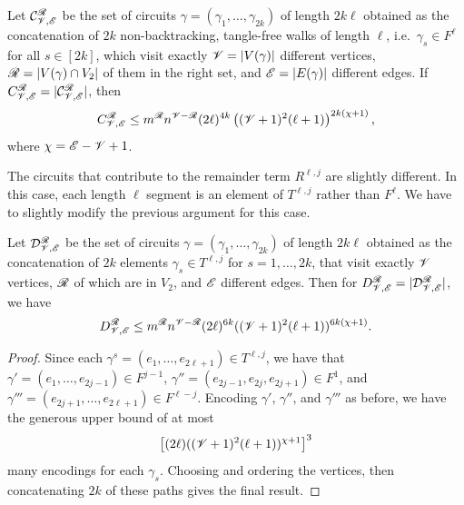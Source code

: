 \begin{lemma}
\label{lem:circuit_count}
Let $\mathcal{C}_{\mathscr{V}, \mathscr{E}}^{\mathscr{R}}$ 
be the set of circuits
$\gamma = (\gamma_1, \ldots, \gamma_{2k})$
of length $2 k \ell$ obtained as the
concatenation of $2k$ non-backtracking,
tangle-free walks of length
$\ell$,
i.e.\ $\gamma_s \in F^\ell$ for all $s \in [2k]$,
which visit exactly 
$\mathscr{V} = |V(\gamma)|$ different vertices, 
$\mathscr{R} = |V(\gamma) \cap V_2|$ of them in the right set, and
$\mathscr{E} = |E(\gamma)|$ different edges.
If $C_{\mathscr{V}, \mathscr{E}}^{\mathscr{R}} = |\mathcal{C}_{\mathscr{V}, \mathscr{E}}^{\mathscr{R}}|$, then
\begin{equation}
C_{\mathscr{V}, \mathscr{E}}^{\mathscr{R}}
\leq
m^{\mathscr{R}} n^{\mathscr{V} - \mathscr{R}} (2 \ell)^{4k} 
\left( (\mathscr{V}+1)^2 (\ell+1) \right)^{2k (\chi + 1)},
\end{equation}
where $\chi = \mathscr{E} - \mathscr{V} + 1$.
\end{lemma}

The circuits that contribute to the remainder term
$R^{\ell, j}$ 
are slightly different.
In this case, each length $\ell$ segment
is an element of $T^{\ell, j}$ rather than $F^{\ell}$.
We have to slightly modify the previous argument for this case.

\begin{lemma}\label{lem:combinatorial_of_reminder}
Let $\mathcal{D}_{\mathscr{V},\mathscr{E}}^{\mathscr{R}}$ 
be the set of circuits
$\gamma = (\gamma_1, \ldots, \gamma_{2k})$
of length $2k\ell$
obtained as the concatenation
of $2k$ elements 
$\gamma_s \in T^{\ell, j}$
for $s = 1, \ldots, 2k$,
that visit exactly $\mathscr{V}$ vertices, 
$\mathscr{R}$ of which are in $V_2$, and $\mathscr{E}$ different edges. 
Then for $D_{\mathscr{V},\mathscr{E}}^{\mathscr{R}} = | \mathcal{D}_{\mathscr{V},\mathscr{E}}^{\mathscr{R}} |$,
we have
\begin{align}
\label{bound:D}
D_{\mathscr{V},\mathscr{E}}^{\mathscr{R}}
\leq
m^{\mathscr{R}} n^{\mathscr{V}-\mathscr{R}}
(2 \ell)^{6k} 
( (\mathscr{V} + 1)^2 (\ell + 1) )^{6k(\chi + 1)} .
\end{align}
\end{lemma}

\begin{proof}
Since each 
$\gamma^s = (e_1, \ldots, e_{2\ell + 1}) \in T^{\ell,j}$,
we have that
$\gamma' = (e_1, \ldots, e_{2j-1}) \in F^{j-1}$,
$\gamma'' = (e_{2j-1}, e_{2j}, e_{2j+1}) \in F^{1}$,
and $\gamma''' = (e_{2j+1}, \ldots, e_{2\ell + 1}) \in F^{\ell - j}$.
Encoding $\gamma'$, $\gamma''$, and $\gamma'''$ as before,
we have the generous upper bound of at most
\[
\left[ (2\ell) ((\mathscr{V} + 1)^2(\ell+1))^{\chi+1} \right]^3
\]  
many encodings for each $\gamma_s$. 
Choosing and ordering the vertices, then concatenating $2k$ of these paths gives
the final result.
\end{proof}


